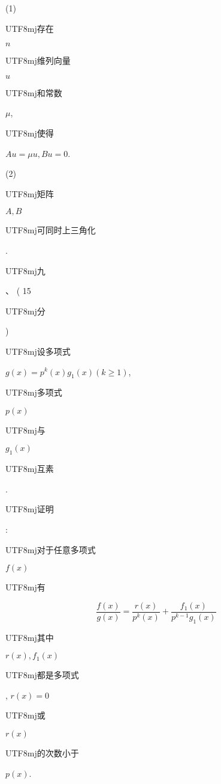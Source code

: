 \documentclass[10pt]{article}
\begin{document}
(1) \begin{CJK}{UTF8}{mj}存在\end{CJK} $n$ \begin{CJK}{UTF8}{mj}维列向量\end{CJK} $u$ \begin{CJK}{UTF8}{mj}和常数\end{CJK} $\mu$, \begin{CJK}{UTF8}{mj}使得\end{CJK} $A u=\mu u, B u=0$.

(2) \begin{CJK}{UTF8}{mj}矩阵\end{CJK} $A, B$ \begin{CJK}{UTF8}{mj}可同时上三角化\end{CJK}.

\begin{CJK}{UTF8}{mj}九\end{CJK}、 ( 15 \begin{CJK}{UTF8}{mj}分\end{CJK}) \begin{CJK}{UTF8}{mj}设多项式\end{CJK} $g(x)=p^{k}(x) g_{1}(x)(k \geq 1)$, \begin{CJK}{UTF8}{mj}多项式\end{CJK} $p(x)$ \begin{CJK}{UTF8}{mj}与\end{CJK} $g_{1}(x)$ \begin{CJK}{UTF8}{mj}互素\end{CJK}. \begin{CJK}{UTF8}{mj}证明\end{CJK}: \begin{CJK}{UTF8}{mj}对于任意多项式\end{CJK} $f(x)$ \begin{CJK}{UTF8}{mj}有\end{CJK}
$$
\frac{f(x)}{g(x)}=\frac{r(x)}{p^{k}(x)}+\frac{f_{1}(x)}{p^{k-1} g_{1}(x)}
$$
\begin{CJK}{UTF8}{mj}其中\end{CJK} $r(x), f_{1}(x)$ \begin{CJK}{UTF8}{mj}都是多项式\end{CJK}, $r(x)=0$ \begin{CJK}{UTF8}{mj}或\end{CJK} $r(x)$ \begin{CJK}{UTF8}{mj}的次数小于\end{CJK} $p(x)$.
\end{document}
